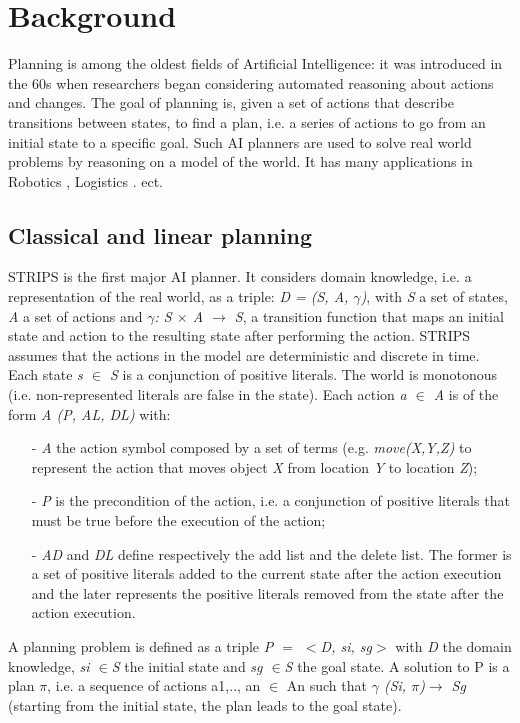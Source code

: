 \chapter{Background} %

\label{Chapter 2} %

Planning is among the oldest fields of Artificial Intelligence: it was introduced in the 60s when researchers began considering automated reasoning about actions and changes. The goal of planning is, given a set of actions that describe transitions between states, to find a plan, i.e. a series of actions to go from an initial state to a specific goal. Such AI planners are used to solve real world problems by reasoning on a model of the world. It has many applications in Robotics \cite{shin1986dynamic}, Logistics \cite{crainic2009models}. ect. %

\section{Classical and linear planning}
STRIPS \cite{fikes1972strips} is the first major AI planner. It considers domain knowledge, i.e. a representation of the real world, as a triple: 
\textit{D = (S, A, $\gamma$)}, 
with \textit{S} a set of states, \textit{A} a set of actions and \textit{$\gamma$: S $\times$ A $\rightarrow$ S}, a transition function that maps an initial state and action to the resulting state after performing the action. STRIPS assumes that the actions in the model are deterministic and discrete in time.
Each state \textit{s $\in$ S}  is a conjunction of positive literals. The world is monotonous (i.e. non-represented literals are false in the state).
Each action \textit{a $\in$ A} is of the form \textit{A (P, AL, DL)} with:
\begin{itemize}
\item[-]	\textit{A} the action symbol composed by a set of terms (e.g. \textit{move(X,Y,Z)} to represent the action that moves object \textit{X} from location \textit{Y} to location \textit{Z});
\item[-]	\textit{P} is the precondition of the action, i.e. a conjunction of positive literals that must be true before the execution of the action;
\item[-]	\textit{AD} and \textit{DL} define respectively the add list and the delete list. The former is a set of positive literals added to the current state after the action execution and the later represents the positive literals removed from the state after the action execution.
\end{itemize}
A planning problem is defined as a triple \textit{P $=$ $<$D, si, sg$>$} with \textit{D} the domain knowledge, \textit{si $\in$S} the initial state and \textit{sg $\in$S} the goal state. A solution to P is a plan $\pi$, i.e. a sequence of actions a1,.., an $\in$ An such that \textit{$\gamma$ (Si, $\pi$)$\rightarrow$ Sg} (starting from the initial state, the plan leads to the goal state).


